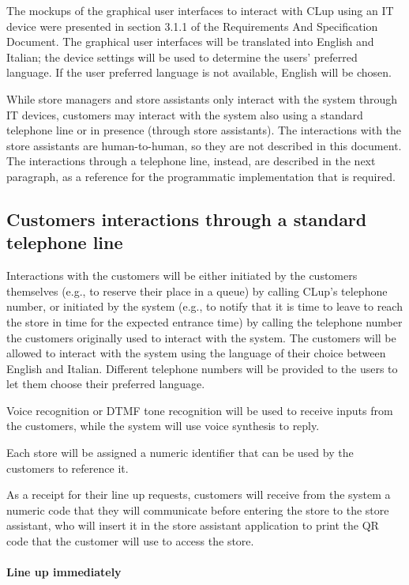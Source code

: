 \documentclass[../../main.tex]{subfiles}
\begin{document}
The mockups of the graphical user interfaces to interact with CLup using an IT
device were presented in section 3.1.1 of the Requirements And Specification
Document. The graphical user interfaces will be translated into English and
Italian; the device settings will be used to determine the users' preferred
language. If the user preferred language is not available, English will be
chosen.

While store managers and store assistants only interact with the system through
IT devices, customers may interact with the system also using a standard
telephone line or in presence (through store assistants). The interactions with
the store assistants are human-to-human, so they are not described in this
document. The interactions through a telephone line, instead, are described in
the next paragraph, as a reference for the programmatic implementation that is
required.

\subsection{Customers interactions through a standard telephone line}

Interactions with the customers will be either initiated by the customers
themselves (e.g., to reserve their place in a queue) by calling CLup's telephone
number, or initiated by the system (e.g., to notify that it is time to leave to
reach the store in time for the expected entrance time) by calling the telephone
number the customers originally used to interact with the system. The customers
will be allowed to interact with the system using the language of their choice
between English and Italian. Different telephone numbers will be provided to the
users to let them choose their preferred language.

Voice recognition or DTMF tone recognition will be used to receive inputs from
the customers, while the system will use voice synthesis to reply.

Each store will be assigned a numeric identifier that can be used by the
customers to reference it.

As a receipt for their line up requests, customers will receive from the system
a numeric code that they will communicate before entering the store to the store
assistant, who will insert it in the store assistant application to print the QR
code that the customer will use to access the store.

\paragraph{Line up immediately}
\end{document}
